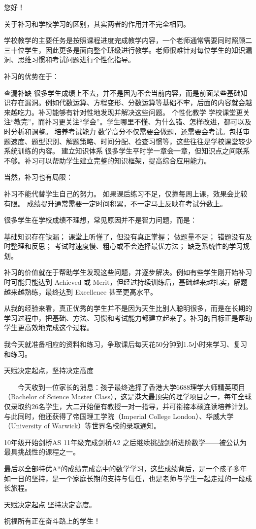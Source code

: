 


您好！

关于补习和学校学习的区别，其实两者的作用并不完全相同。

学校教学的主要任务是按照课程进度完成教学内容，一个老师通常需要同时照顾二三十位学生，因此更多是面向整个班级进行教学。老师很难针对每位学生的知识漏洞、思维习惯和考试问题进行个性化指导。

补习的优势在于：

查漏补缺
很多学生成绩上不去，并不是因为不会当前内容，而是前面某些基础知识存在漏洞。例如代数运算、方程变形、分数运算等基础不牢，后面的内容就会越来越吃力。补习能够有针对性地发现并解决这些问题。
个性化教学
学校课堂更关注“教完”，而补习更关注“学会”。学生哪里不懂、为什么错、怎样改进，都可以及时分析和调整。
培养考试能力
数学高分不仅需要会做题，还需要会考试。包括审题速度、题型识别、解题策略、时间分配、检查习惯等，这些往往是学校课堂较少系统训练的内容。
建立知识体系
很多学生平时学一章会一章，但知识点之间联系不够。补习可以帮助学生建立完整的知识框架，提高综合应用能力。

当然，补习也有局限：

补习不能代替学生自己的努力。
如果课后练习不足，仅靠每周上课，效果会比较有限。
成绩提升通常需要一定时间积累，不一定马上反映在考试分数上。

很多学生在学校成绩不理想，常见原因并不是智力问题，而是：

基础知识存在缺漏；
课堂上听懂了，但没有真正掌握；
做题量不足；
错题没有及时整理和反思；
考试时速度慢、粗心或不会选择最优方法；
缺乏系统性的学习规划。

补习的价值就在于帮助学生发现这些问题，并逐步解决。例如有些学生刚开始补习时可能只能达到 Achieved 或 Merit，但经过持续训练后，基础越来越扎实，解题越来越熟练，最终达到 Excellence 甚至更高水平。

从我的经验来看，真正优秀的学生并不是因为天生比别人聪明很多，而是在长期的学习过程中，把基础、方法、习惯和考试能力都建立起来了。补习的目标正是帮助学生更高效地完成这个过程。





我今天就准备相应的资料和练习，争取课后每天花50分钟到1.5小时来学习、复习和练习。



\clearpage\indent%
\begin{boxSkill}{天赋决定起点，坚持决定高度}

　　今天收到一位家长的消息：孩子最终选择了香港大学6688理学大师精英项目（Bachelor of Science Master Class），这是港大最顶尖的理学项目之一，每年全球仅录取约26名学生，大二开始便有教授一对一指导，并可衔接本硕连读培养计划。 与此同时，他还获得了帝国理工学院（Imperial College London）、华威大学（University of Warwick）等世界名校的录取通知。


10年级开始剑桥AS
11年级完成剑桥A2
之后继续挑战剑桥进阶数学——被公认为最具挑战性的课程之一。

最后以全部特优A*的成绩完成高中的数学学习，这些成绩背后，是一个孩子多年如一日的坚持，是一个家庭长期的支持与信任，也是老师与学生一起走过的一段成长旅程。


天赋决定起点
坚持决定高度。


祝福所有正在奋斗路上的学生！


\end{boxSkill}